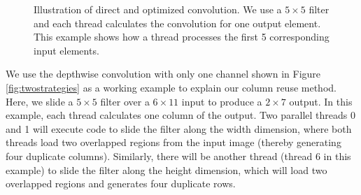 \begin{figure}[!t]
\centering
{}
\hspace{0em}
\hspace{0em}

\caption{Illustration of direct and optimized convolution. We use a $5 \times 5$ filter  and each thread calculates the convolution for one
output element. This example shows how a thread processes the first 5 corresponding input elements.} \label{fig:corealgo}
\end{figure}

 We use the depthwise convolution with only one channel shown in Figure \ref{fig:twostrategies} as a working example to explain our
column reuse method. 
Here, we slide a $5 \times 5$ filter over a $6 \times 11$ input to produce a $2 \times 7$ output. 
In this example, each thread calculates one column of the output. 
Two parallel threads 0 and 1 will execute code to slide the filter along the width
dimension, where both threads load two overlapped regions from the input image (thereby generating four duplicate columns). Similarly,
there will be another thread (thread 6 in this example) to slide the filter along the height dimension, which will load two overlapped
regions and generates four duplicate rows.



